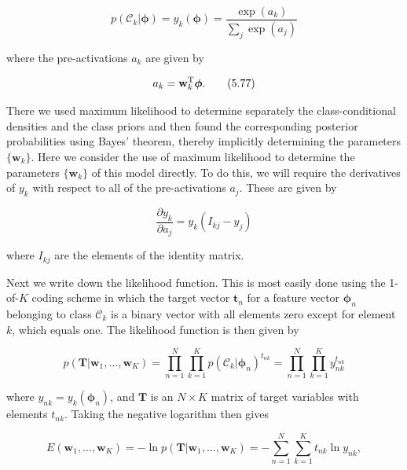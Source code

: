 \documentclass{article}
\begin{document}
\begin{equation}
p(\mathcal{C}_{k}|\boldsymbol{\phi})=y_{k}(\boldsymbol{\phi})=\frac{\exp(a_{k})}{\sum_{j}\exp(a_{j})}
\tag{5.76}
\end{equation}

where the pre-activations $a_{k}$ are given by

\begin{equation}
a_{k}=\mathbf{w}_{k}^{\rm T}\boldsymbol{\phi}.
\tag{5.77}
\end{equation}

There we used maximum likelihood to determine separately the class-conditional densities and the class priors and then found the corresponding posterior probabilities using Bayes' theorem, thereby implicitly determining the parameters $\{\mathbf{w}_{k}\}$. Here we consider the use of maximum likelihood to determine the parameters $\{\mathbf{w}_{k}\}$ of this model directly. To do this, we will require the derivatives of $y_{k}$ with respect to all of the pre-activations $a_{j}$. These are given by

\begin{equation}
\frac{\partial y_{k}}{\partial a_{j}}=y_{k}(I_{kj}-y_{j})
\tag{5.78}
\end{equation}

where $I_{kj}$ are the elements of the identity matrix.

Next we write down the likelihood function. This is most easily done using the 1-of-$K$ coding scheme in which the target vector $\mathbf{t}_{n}$ for a feature vector $\boldsymbol{\phi}_{n}$ belonging to class $\mathcal{C}_{k}$ is a binary vector with all elements zero except for element $k$, which equals one. The likelihood function is then given by

\begin{equation}
p(\mathbf{T}|\mathbf{w}_{1},\ldots,\mathbf{w}_{K})=\prod_{n=1}^{N}\prod_{k=1}^{K}p(\mathcal{C}_{k}|\boldsymbol{\phi}_{n})^{t_{nk}}=\prod_{n=1}^{N}\prod_{k=1}^{K}y_{nk}^{t_{nk}}
\tag{5.79}
\end{equation}

where $y_{nk}=y_{k}(\boldsymbol{\phi}_{n})$, and $\mathbf{T}$ is an $N\times K$ matrix of target variables with elements $t_{nk}$. Taking the negative logarithm then gives

\begin{equation}
E(\mathbf{w}_{1},\ldots,\mathbf{w}_{K})=-\ln p(\mathbf{T}|\mathbf{w}_{1},\ldots,\mathbf{w}_{K})=-\sum_{n=1}^{N}\sum_{k=1}^{K}t_{nk}\ln y_{nk},
\tag{5.80}
\end{equation}
\end{document}
